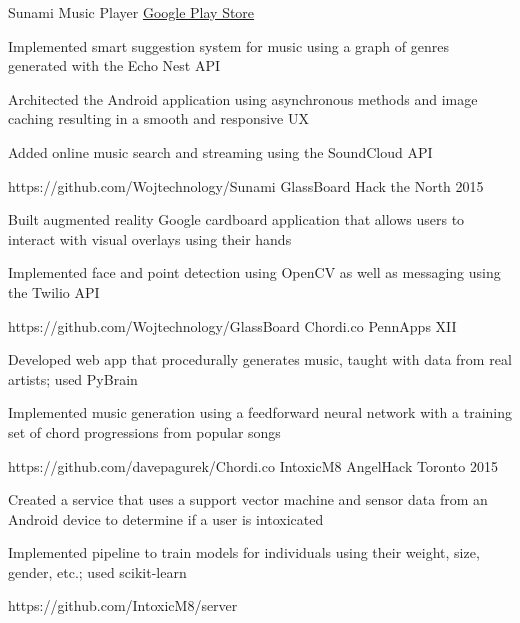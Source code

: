 \begin{cvprojects}
  \cvproject
    {Sunami Music Player}
    {\href{http://play.google.com/store/apps/details?id=com.wojtechnology.sunami}{Google Play Store}}
    {
      \begin{cvitems}
        \item Implemented smart suggestion system for music using a graph of genres generated with the Echo Nest API
        \item Architected the Android application using asynchronous methods and image caching resulting in a smooth and responsive UX
        \item Added online music search and streaming using the SoundCloud API
      \end{cvitems}
    }
    {https://github.com/Wojtechnology/Sunami}
  \cvproject
    {GlassBoard}
    {Hack the North 2015}
    {
      \begin{cvitems}
        \item Built augmented reality Google cardboard application that allows users to interact with visual overlays using their hands
        \item Implemented face and point detection using OpenCV as well as messaging using the Twilio API
      \end{cvitems}
    }
    {https://github.com/Wojtechnology/GlassBoard}
  \cvproject
    {Chordi.co}
    {PennApps XII}
    {
      \begin{cvitems}
        \item Developed web app that procedurally generates music, taught with data from real artists; used PyBrain
        \item Implemented music generation using a feedforward neural network with a training set of chord progressions from popular songs
      \end{cvitems}
    }
    {https://github.com/davepagurek/Chordi.co}
  \cvproject
    {IntoxicM8}
    {AngelHack Toronto 2015}
    {
      \begin{cvitems}
        \item Created a service that uses a support vector machine and sensor data from an Android device to determine if a user is intoxicated
        \item Implemented pipeline to train models for individuals using their weight, size, gender, etc.; used scikit-learn
      \end{cvitems}
    }
    {https://github.com/IntoxicM8/server}
\end{cvprojects}
